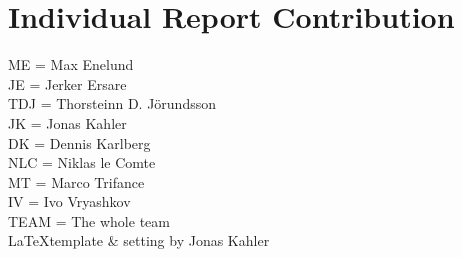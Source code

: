 \label{appendix}
\appendix

\chapter{Individual Report Contribution}
ME = Max Enelund\\
JE = Jerker Ersare\\
TDJ = Thorsteinn D. J{\"o}rundsson\\
JK = Jonas Kahler\\
DK = Dennis Karlberg\\
NLC = Niklas le Comte\\
MT = Marco Trifance\\
IV = Ivo Vryashkov\\
TEAM = The whole team\\
\LaTeX template \& setting by Jonas Kahler